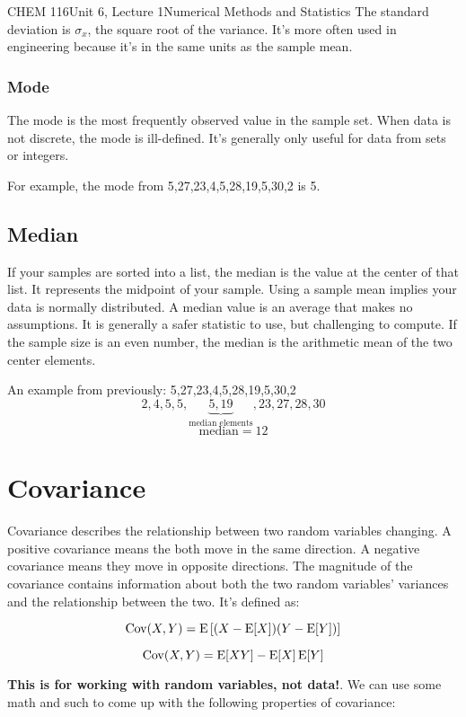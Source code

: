 \documentclass{article}
\DeclareMathOperator{\Cov}{Cov}
\begin{document}
\begin{tdoc}{CHEM 116}{Unit 6, Lecture 1}{Numerical Methods and Statistics}
The standard deviation is $\sigma_x$, the square root of the
variance. It's more often used in engineering because it's in the same
units as the sample mean.

\subsubsection{Mode}
The mode is the most frequently observed value in the sample set. When
data is not discrete, the mode is ill-defined. It's generally only
useful for data from sets or integers.

For example, the mode from 5,27,23,4,5,28,19,5,30,2 is 5.

\subsection{Median}
If your samples are sorted into a list, the median is the value at the
center of that list. It represents the midpoint of your sample. Using
a sample mean implies your data is normally distributed. A median
value is an average that makes no assumptions. It is generally a safer
statistic to use, but challenging to compute. If the sample size is an
even number, the median is the arithmetic mean of the two center
elements.

An example from previously: 5,27,23,4,5,28,19,5,30,2
\[
2,4,5,5,\underbrace{5,19}_{\textrm{median elements}},23,27,28,30
\]
\[
\textrm{median} = 12
\]

\section{Covariance}

Covariance describes the relationship between two random variables
changing. A positive covariance means the both move in the same
direction. A negative covariance means they move in opposite
directions. The magnitude of the covariance contains information about
both the two random variables' variances and the relationship between
the two. It's defined as:

\begin{equation}
  \Cov(X,Y) = \E\left[(X - \E[X])(Y - \E[Y])\right]
\end{equation}

\begin{equation}
  \Cov(X,Y) = \E[XY] - \E[X]\E[Y]
\end{equation}

{\bf This is for working with random variables, not data!}. We can use
some math and such to come up with the following properties of covariance:


\end{tdoc}
\end{document}
